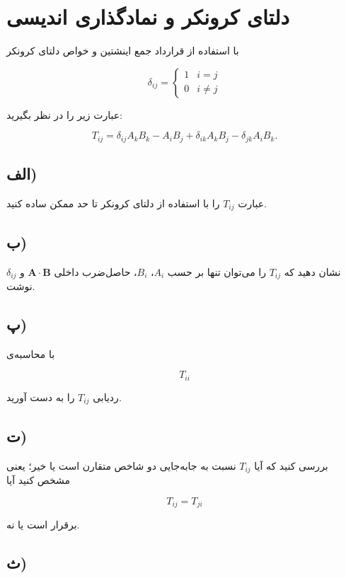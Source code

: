 \documentclass[a4paper,16pt]{article}
\begin{document}
	\section{دلتای کرونکر و نمادگذاری اندیسی}
	
	با استفاده از قرارداد جمع اینشتین و خواص دلتای کرونکر
	
	\[
	\delta_{ij}=
	\begin{cases}
		1&i=j\\
		0&i\neq j
	\end{cases}
	\]
	
	عبارت زیر را در نظر بگیرید:
	
	\[
	T_{ij}
	=
	\delta_{ij}A_kB_k
	-
	A_iB_j
	+
	\delta_{ik}A_kB_j
	-
	\delta_{jk}A_iB_k.
	\]
	
	\subsection*{الف)}
	
	عبارت $T_{ij}$ را با استفاده از دلتای کرونکر تا حد ممکن ساده کنید.
	
	\subsection*{ب)}
	
	نشان دهید که $T_{ij}$ را می‌توان تنها بر حسب $A_i$، $B_i$، حاصل‌ضرب داخلی $\mathbf{A}\cdot\mathbf{B}$ و $\delta_{ij}$ نوشت.
	
	\subsection*{پ)}
	
	با محاسبه‌ی
	
	\[
	T_{ii}
	\]
	
	ردیابی $T_{ij}$ را به دست آورید.
	
	\subsection*{ت)}
	
	بررسی کنید که آیا $T_{ij}$ نسبت به جابه‌جایی دو شاخص متقارن است یا خیر؛ یعنی مشخص کنید آیا
	
	\[
	T_{ij}=T_{ji}
	\]
	
	برقرار است یا نه.
	
	\subsection*{ث)}
	
\end{document}
